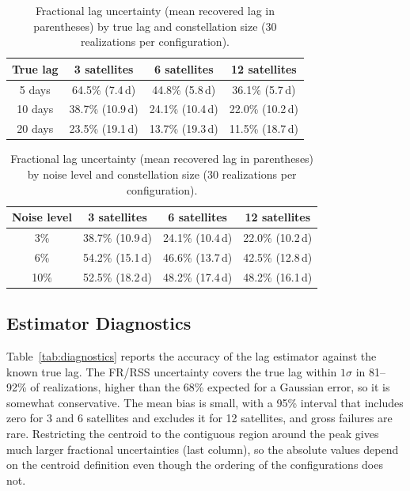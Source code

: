\documentclass[11pt]{article}
\begin{document}
\begin{table}[htbp]
\centering
\caption{Fractional lag uncertainty (mean recovered lag in parentheses) by true lag and constellation size (30 realizations per configuration).}
\label{tab:lagsensitivity}
\begin{tabular}{@{}cccc@{}}
\toprule
True lag & 3 satellites & 6 satellites & 12 satellites \\
\midrule
5 days & 64.5\% (7.4\,d) & 44.8\% (5.8\,d) & 36.1\% (5.7\,d) \\
10 days & 38.7\% (10.9\,d) & 24.1\% (10.4\,d) & 22.0\% (10.2\,d) \\
20 days & 23.5\% (19.1\,d) & 13.7\% (19.3\,d) & 11.5\% (18.7\,d) \\
\bottomrule
\end{tabular}
\end{table}

\begin{table}[htbp]
\centering
\caption{Fractional lag uncertainty (mean recovered lag in parentheses) by noise level and constellation size (30 realizations per configuration).}
\label{tab:noisesensitivity}
\begin{tabular}{@{}cccc@{}}
\toprule
Noise level & 3 satellites & 6 satellites & 12 satellites \\
\midrule
3\% & 38.7\% (10.9\,d) & 24.1\% (10.4\,d) & 22.0\% (10.2\,d) \\
6\% & 54.2\% (15.1\,d) & 46.6\% (13.7\,d) & 42.5\% (12.8\,d) \\
10\% & 52.5\% (18.2\,d) & 48.2\% (17.4\,d) & 48.2\% (16.1\,d) \\
\bottomrule
\end{tabular}
\end{table}

\subsection{Estimator Diagnostics}
\label{sec:diag}

Table~\ref{tab:diagnostics} reports the accuracy of the lag estimator against the known true lag. The FR/RSS uncertainty covers the true lag within $1\sigma$ in 81--92\% of realizations, higher than the 68\% expected for a Gaussian error, so it is somewhat conservative. The mean bias is small, with a 95\% interval that includes zero for 3 and 6 satellites and excludes it for 12 satellites, and gross failures are rare. Restricting the centroid to the contiguous region around the peak gives much larger fractional uncertainties (last column), so the absolute values depend on the centroid definition even though the ordering of the configurations does not.
\end{document}
